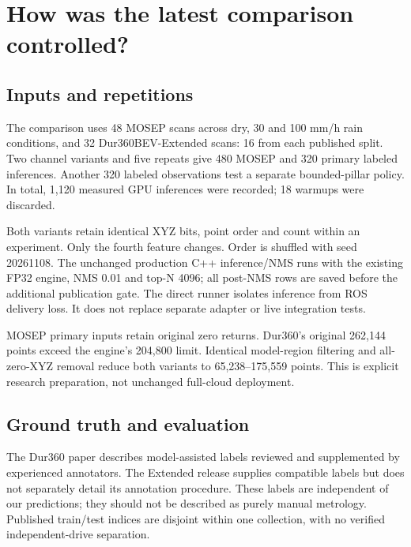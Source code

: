\documentclass[11pt,a4paper]{article}
\begin{document}
\section{How was the latest comparison controlled?}
\subsection{Inputs and repetitions}
The comparison uses 48 MOSEP scans across dry, 30 and 100 mm/h rain conditions,
and 32 Dur360BEV-Extended scans: 16 from each published split. Two channel
variants and five repeats give 480 MOSEP and 320 primary labeled inferences.
Another 320 labeled observations test a separate bounded-pillar policy. In total,
1,120 measured GPU inferences were recorded; 18 warmups were discarded.

Both variants retain identical XYZ bits, point order and count within an
experiment. Only the fourth feature changes. Order is shuffled with seed
20261108. The unchanged production C++ inference/NMS runs with the existing FP32
engine, NMS 0.01 and top-N 4096; all post-NMS rows are saved before the additional
publication gate. The direct runner isolates inference from ROS delivery loss.
It does not replace separate adapter or live integration tests.

MOSEP primary inputs retain original zero returns. Dur360's original 262,144
points exceed the engine's 204,800 limit. Identical model-region filtering and
all-zero-XYZ removal reduce both variants to 65,238--175,559 points. This is
explicit research preparation, not unchanged full-cloud deployment.

\subsection{Ground truth and evaluation}
The Dur360 paper describes model-assisted labels reviewed and supplemented by
experienced annotators. The Extended release supplies compatible labels but does
not separately detail its annotation procedure. These labels are independent of
our predictions; they should not be described as purely manual metrology.
Published train/test indices are disjoint within one collection, with no verified
independent-drive separation.
\end{document}
